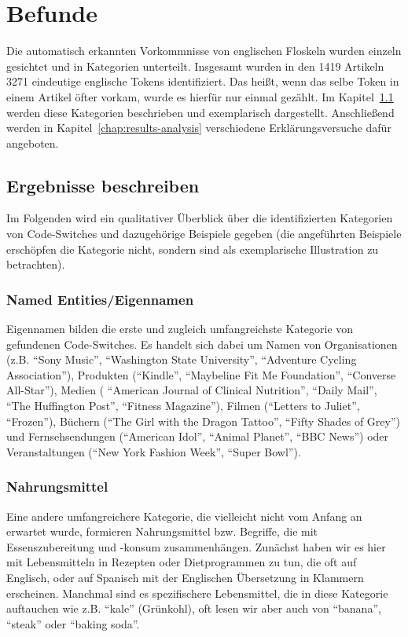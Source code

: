 \section{Befunde}


Die automatisch erkannten Vorkommnisse von englischen Floskeln wurden einzeln gesichtet und in Kategorien unterteilt.
Insgesamt wurden in den 1419 Artikeln 3271 eindeutige englische Tokens identifiziert. %
Das heißt, wenn das selbe Token in einem Artikel öfter vorkam, wurde es hierfür nur einmal gezählt.
Im Kapitel~\ref{chap:results-desc} werden diese Kategorien beschrieben und exemplarisch dargestellt.
Anschließend werden in Kapitel~\ref{chap:results-analysis} verschiedene Erklärungsversuche dafür angeboten.


\subsection{Ergebnisse beschreiben}
\label{chap:results-desc}

Im Folgenden wird ein qualitativer Überblick über die identifizierten Kategorien von Code-Switches und dazugehörige Beispiele gegeben (die angeführten Beispiele erschöpfen die Kategorie nicht, sondern sind als exemplarische Illustration zu betrachten).

\subsubsection{Named Entities/Eigennamen}
Eigennamen bilden die erste und zugleich umfangreichste Kategorie von gefundenen Code-Switches.
Es handelt sich dabei um Namen von Organisationen (z.B. ``Sony Music'', ``Washington State University'', ``Adventure Cycling Association''),
Produkten (``Kindle'', ``Maybeline Fit Me Foundation'', ``Converse All-Star''),
Medien ( ``American Journal of Clinical Nutrition'', ``Daily Mail'', ``The Huffington Post'', ``Fitness Magazine''),
Filmen (``Letters to Juliet'', ``Frozen''),
Büchern (``The Girl with the Dragon Tattoo'', ``Fifty Shades of Grey'')
und Fernsehsendungen (``American Idol'', ``Animal Planet'', ``BBC News'')
oder Veranstaltungen (``New York Fashion Week'', ``Super Bowl'').

\subsubsection{Nahrungsmittel}
Eine andere umfangreichere Kategorie, die vielleicht nicht vom Anfang an erwartet wurde, formieren Nahrungsmittel bzw. Begriffe, die mit Essenszubereitung und -konsum zusammenhängen.
Zunächst haben wir es hier mit Lebensmitteln in Rezepten oder Dietprogrammen zu tun, die oft auf Englisch, oder auf Spanisch mit der Englischen Übersetzung in Klammern erscheinen.
Manchmal sind es spezifischere Lebensmittel, die in diese Kategorie auftauchen wie z.B. ``kale'' (Grünkohl), oft lesen wir aber auch von ``banana'', ``steak'' oder ``baking soda''.

